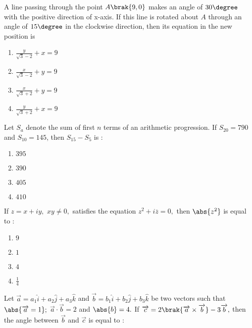 \iffalse
\title{2024-January Session-01-30-2024-shift-1}
\author{EE24BTECH11008-ASLIN GARVASIS}
\section{mcq-single}
\fi
    \item A line passing through the point $A\brak{9,0}$ makes an angle of $30\degree$ with the positive direction of x-axis. If this line is rotated about $A$ through an angle of $15\degree$ in the clockwise direction, then its equation in the new position is
	    \hfill{} \\
    \begin{enumerate}
        \item $\frac{y}{\sqrt{3}-2}+x=9$
        \item $\frac{x}{\sqrt{3}-2}+y=9$
        \item $\frac{x}{\sqrt{3}+2}+y=9$
        \item $\frac{y}{\sqrt{3}+2}+x=9$
    \end{enumerate}
    \item Let $S_a$ denote the sum of first $n$ terms of an arithmetic progression. If $S_{20}=790$ and $S_{10}=145$, then $S_{15}-S_5$ is $:$
	   \hfill{} \\
    \begin{enumerate}
        \item $395$
        \item $390$
        \item $405$
        \item $410$
    \end{enumerate}
    \item If $z = x + iy,$ $xy\neq 0,$ satisfies the equation $z^2+i\overline{z}=0,$ then $\abs{z^2}$ is equal to $:$
	   \hfill{} \\
    \begin{enumerate}
        \item $9$
        \item $1$
        \item $4$
        \item $\frac{1}{4}$
    \end{enumerate}
    \item Let $\overrightarrow{a}=a_1\hat{i}+a_2\hat{j}+a_3\hat{k}$ and $\overrightarrow{b}=b_1\hat{i}+b_2\hat{j}+b_3\hat{k}$ be two vectors such that $\abs{\overrightarrow{a}=1};$ $\overrightarrow{a}\cdot\overrightarrow{b}=2$ and $\abs{b}=4.$ If $\overrightarrow{c}=2\brak{\overrightarrow{a}\times\overrightarrow{b}}-3\overrightarrow{b},$ then the angle between $\overrightarrow{b}$ and $\overrightarrow{c}$ is equal to $:$
